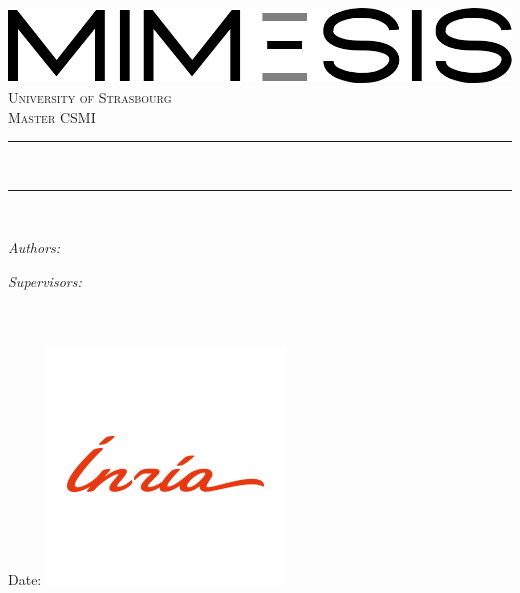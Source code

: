 \begin{titlepage}

	\newcommand{\HRule}{\rule{\linewidth}{0.5mm}}
	
	\begin{center}
		\includegraphics[width = 0.5\linewidth]{images/logo-mimesis.png} \\ [1.5cm] 
	
		\textsc{\Large University of Strasbourg}\\[0.5cm] 
		\textsc{\large Master CSMI}\\[0.95cm] 
		
		\HRule \\[0.4cm]
		\huge\bfseries\reporttitle\par %
		\HRule \\[0.4cm]
	\end{center}
	
	\vspace{1cm}
	
	\begin{flushleft} \large
		\begin{minipage}{0.4\hsize}
			\textit{Authors:}\\
			\reportauthorOne
		\end{minipage} \hfill 
		\begin{minipage}{0.4\hsize}
			\textit{Supervisors:}\\
			\reportsupervisorOne\\
			\reportsupervisorTwo\\
			\reportsupervisorThree
		\end{minipage}
	\end{flushleft}
	\vspace{2.5 cm}
	\makeatletter
	Date: \@date
	\hfill
	\includegraphics[width = 0.2\linewidth]{images/inria.png}\\[1.5cm] 
	
	\vfill %
	
	\makeatother


\end{titlepage}

